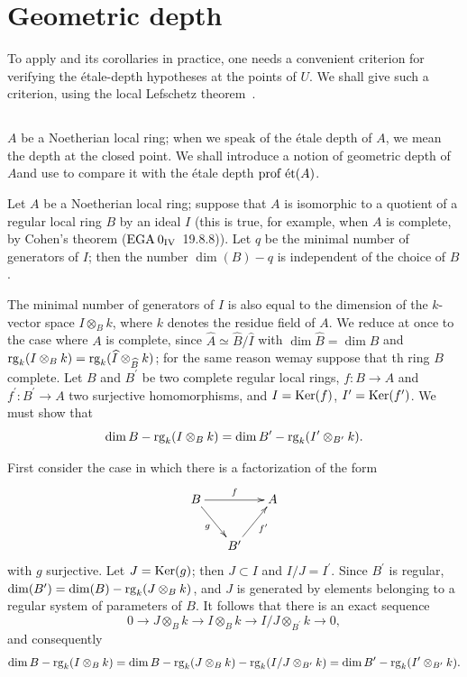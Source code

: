 \section{Geometric depth} \label{XIV.5}

To apply  and its corollaries in practice, one needs a convenient criterion for verifying the étale-depth hypotheses at the points of $U$. We shall give such a criterion, using the local Lefschetz theorem~.

\subsection{\texorpdfstring{}{XIV.5.1}} \label{XIV.5.1}  $A$ be a Noetherian local ring; when we speak of the étale depth of $A$, we mean the depth at the closed point. We shall introduce a notion of \og geometric depth of $A$\fg and use  to compare it with the étale depth $\operatorname{prof\;\acute{e}t}(A)$.

\begin{proposition} \label{XIV.5.2} Let $A$ be a Noetherian local ring; suppose that $A$ is isomorphic to a quotient of a regular local ring $B$ by an ideal $I$ (this is true, for example, when $A$ is complete, by Cohen's theorem (\textup{$\textup{EGA}\kern.2em 0_{\textup{IV}}$~19.8.8})). Let $q$ be the minimal number of generators of $I$; then the number $\dim(B)-q$ is independent of the choice of $B$.
\end{proposition}

The minimal number of generators of $I$ is also equal to the dimension of the $k$-vector space $I\otimes_{B}k$, where $k$ denotes the residue field of $A$. We reduce at once to the case where $A$ is complete, since $\widehat{A}\simeq\widehat{B}/\widehat{I}$ with $\dim \widehat{B}=\dim B$ and $\operatorname{rg}_{k}(I\otimes_{B}k)=\operatorname{rg}_{k}(\widehat{I}\otimes_{\widehat{B}}k)$; for the same reason we\pageoriginale may suppose that th ring $B$  complete\sisi{}{}. Let $B$ and $B^{\prime}$ be two complete regular local rings, $f\colon B\to A$ and $f^{\prime}\colon B^{\prime}\to A$ two surjective homomorphisms, and $I=\operatorname{Ker}(f)$, $I^{\prime}=\operatorname{Ker}(f^{\prime})$. We must show that
$$
\dim B-\operatorname{rg}_{k}(I\otimes_{B}k)=\dim B^{\prime}-\operatorname{rg}_{k}(I^{\prime}\otimes_{B^{\prime}}k).
$$

First consider the case in which there is a factorization
of the form
$$
\xymatrix@C=15pt{ B\ar[rr]^-{f}\ar[rd]_-{g} & & A\\
& B^{\prime}\ar[ru]_-{f^{\prime}} & }$$
with $g$ surjective. Let $J=\operatorname{Ker}(g)$; then $J\subset I$ and $I/J=I^{\prime}$. Since $B^{\prime}$ is regular, $\dim(B^{\prime})=\dim(B)-\operatorname{rg}_{k}(J\otimes_{B}k)$, and $J$ is generated by elements belonging to a regular system of parameters of $B$. It follows that there is an exact sequence
$$0\to J\otimes_{B}k\to I\otimes_{B}k\to I/J\otimes_{B^{\prime}}k\to 0,
$$
and consequently
$$
\dim B-\operatorname{rg}_{k}(I\otimes_{B}k)=\dim B-\operatorname{rg}_{k}(J\otimes_{B}k)-\operatorname{rg}_{k}(I/J\otimes_{B^{\prime}}k)=\dim B^{\prime}-\operatorname{rg}_{k}(I^{\prime}\otimes_{B^{\prime}}k).
$$

